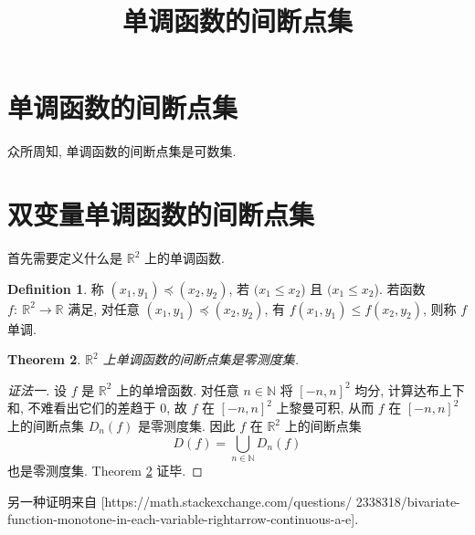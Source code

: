 \documentclass[a4paper,11pt]{article}
\title{单调函数的间断点集}
\newtheorem{theorem}{Theorem}[section]
\theoremstyle{definition}
\newtheorem{definition}[theorem]{Definition}
\begin{document}
\begin{CJK*}{UTF8}{gbsn}

\maketitle

\section{单调函数的间断点集}

众所周知, 单调函数的间断点集是可数集.

\section{双变量单调函数的间断点集}

首先需要定义什么是 $ \mathbb{R}^2 $ 上的单调函数.

\begin{definition}
    称 $ (x_1, y_1) \preceq (x_2, y_2) $, 若 $( x_1 \leq x_2 $) 且 $( x_1 \leq x_2 $).
    若函数 $ f :\ \mathbb{R}^2 \to \mathbb{R} $ 满足, 
    对任意 $ (x_1, y_1) \preceq (x_2, y_2) $, 有 $ f(x_1, y_1) \leq f(x_2, y_2) $, 则称 $ f $ 单调.
\end{definition}

\begin{theorem} \label{3}
    $ \mathbb{R}^2 $ 上单调函数的间断点集是零测度集.
\end{theorem}

\begin{proof}[证法一]
    设 $ f $ 是 $ \mathbb{R}^2 $ 上的单增函数. 对任意 $ n \in \mathbb{N} $
    将 $ [-n, n]^2 $ 均分, 计算达布上下和, 不难看出它们的差趋于 $ 0 $, 故 $ f $ 在 $ [-n, n]^2 $ 上黎曼可积,
    从而 $ f $ 在 $ [-n, n]^2 $ 上的间断点集 $ D_n(f) $ 是零测度集.
    因此 $ f $ 在 $ \mathbb{R}^2 $ 上的间断点集 
    $$
        D(f) = \bigcup_{n \in \mathbb{N}} D_n(f)
    $$
    也是零测度集. Theorem \ref{3} 证毕.
\end{proof}

另一种证明来自 [https://math.stackexchange.com/questions/
2338318/bivariate-function-monotone-in-each-variable-rightarrow-continuous-a-e].


\end{CJK*}
\end{document}
